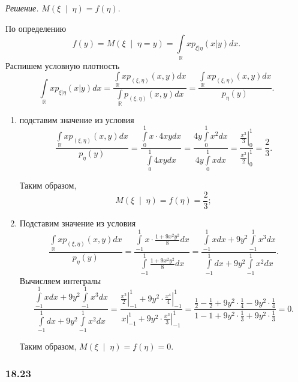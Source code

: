 \textit{Решение.} $M \left( \xi \; \middle| \; \eta \right) = f \left( \eta \right) $.

По определению
$$f \left( y \right) =
  M \left( \xi \; \middle| \; \eta = y \right) =
  \int \limits_{ \mathbb{R}}
    xp_{ \left. \xi \right| \eta } \left( \left. x \right| y \right) dx.$$
Распишем условную плотность
$$ \int \limits_{ \mathbb{R}}
    xp_{ \left. \xi \right| \eta } \left( \left. x \right| y \right) dx =
  \frac{ \int \limits_{ \mathbb{R}} xp_{ \left( \xi, \eta \right) } \left( x, y \right) dx}{ \int \limits_{ \mathbb{R}} p_{ \left( \xi, \eta \right) } \left( x, y \right) dx} =
  \frac{ \int \limits_{ \mathbb{R}} xp_{ \left( \xi, \eta \right) } \left( x, y \right) dx}{p_{ \eta } \left( y \right)}.$$
\begin{enumerate}[label=\alph*)]
  \item подставим значение из условия
  $$ \frac{ \int \limits_{ \mathbb{R}} xp_{ \left( \xi, \eta \right) } \left( x, y \right) dx}{p_{ \eta } \left( y \right)} =
    \frac{ \int \limits_0^1 x \cdot 4xy dx}{ \int \limits_0^1 4xydx} =
    \frac{4y \int \limits_0^1 x^2 dx}{4y \int \limits_0^1 xdx} =
    \frac{ \left. \frac{x^3}{3} \right|_0^1}{ \left. \frac{x^2}{2} \right|_0^1} =
    \frac{2}{3}.$$

  Таким образом,
  $$M \left( \xi \; \middle| \; \eta \right) =
    f \left( \eta \right) =
    \frac{2}{3};$$
  \item Подставим значение из условия
  $$\frac{ \int \limits_{ \mathbb{R}} xp_{ \left( \xi, \eta \right) } \left( x, y \right) dx}{p_{ \eta } \left( y \right)} =
    \frac{ \int \limits_{-1}^1 x \cdot \frac{1 + 9x^2 y^2}{8} dx}{ \int \limits_{-1}^1 \frac{1 + 9x^2 y^2}{8} dx} =
    \frac{ \int \limits_{-1}^1 xdx + 9y^2 \int \limits_{-1}^1 x^3 dx}{ \int \limits_{-1}^1 dx + 9y^2 \int \limits_{-1}^1 x^2 dx}.$$
  Вычисляем интегралы
  $$ \frac{ \int \limits_{-1}^1 xdx + 9y^2 \int \limits_{-1}^1 x^3 dx}{ \int \limits_{-1}^1 dx + 9y^2 \int \limits_{-1}^1 x^2 dx} =
    \frac{ \left. \frac{x^2}{2} \right|_{-1}^1 + 9y^2 \cdot \left. \frac{x^4}{4} \right|_{-1}^1}{ \left. x \right|_{-1}^1 + 9y^2 \cdot \left. \frac{x^3}{3} \right|_{-1}^1} =
    \frac{ \frac{1}{2} - \frac{1}{2} + 9y^2 \cdot \frac{1}{4} - 9y^2 \cdot \frac{1}{4}}{1 - 1 + 9y^2 \cdot \frac{1}{3} + 9y^2 \cdot \frac{1}{3}} =
    0.$$

  Таким образом, $M \left( \xi \; \middle| \; \eta \right) = f \left( \eta \right) = 0$.
\end{enumerate}

\subsubsection*{18.23}

